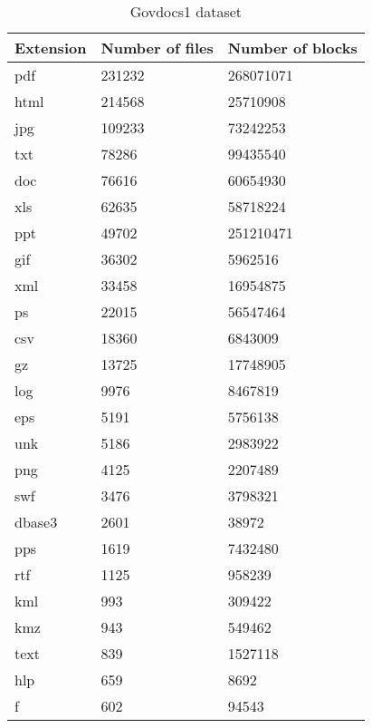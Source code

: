 \begin{table}[!ht]
    \centering
    \caption{Govdocs1 dataset}
    \label{tab:govdocs1}
\begin{tabular}{|l|l|l|}
\hline
Extension & Number of files & Number of blocks \\ \hline
                                                  \hline
pdf       & 231232          & 268071071    \\ \hline
html      & 214568          & 25710908     \\ \hline
jpg       & 109233          & 73242253     \\ \hline
txt       & 78286           & 99435540     \\ \hline
doc       & 76616           & 60654930     \\ \hline
xls       & 62635           & 58718224     \\ \hline
ppt       & 49702           & 251210471    \\ \hline
gif       & 36302           & 5962516      \\ \hline
xml       & 33458           & 16954875     \\ \hline
ps        & 22015           & 56547464     \\ \hline
csv       & 18360           & 6843009      \\ \hline
gz        & 13725           & 17748905     \\ \hline
log       & 9976            & 8467819      \\ \hline
eps       & 5191            & 5756138      \\ \hline
unk       & 5186            & 2983922      \\ \hline
png       & 4125            & 2207489      \\ \hline
swf       & 3476            & 3798321      \\ \hline
dbase3    & 2601            & 38972        \\ \hline
pps       & 1619            & 7432480      \\ \hline
rtf       & 1125            & 958239       \\ \hline
kml       & 993             & 309422       \\ \hline
kmz       & 943             & 549462       \\ \hline
text      & 839             & 1527118      \\ \hline
hlp       & 659             & 8692         \\ \hline
f         & 602             & 94543        \\ \hline

\end{tabular}
\end{table}
